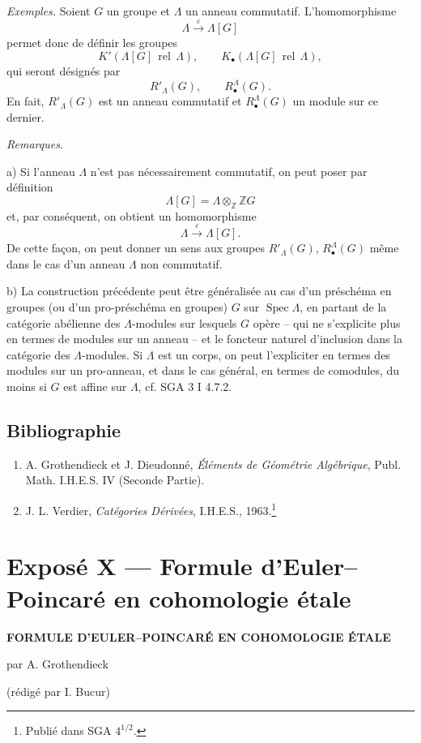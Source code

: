 \documentclass[11pt]{article}
\DeclareMathOperator{\Spec}{Spec}
\providecommand{\Spec}{\operatorname{Spec}}
\providecommand{\Spec}{\operatorname{Spec}}
\providecommand{\Spec}{\operatorname{Spec}}
\providecommand{\Spec}{\operatorname{Spec}}
\begin{document}
\emph{Exemples.} Soient $G$ un groupe et $\Lambda$ un anneau commutatif. L'homomorphisme
\[
\Lambda\xrightarrow{\varepsilon}\Lambda[G]
\]
permet donc de définir les groupes
\[
K'(\Lambda[G]\operatorname{\,rel\,}\Lambda),\qquad
K_\bullet(\Lambda[G]\operatorname{\,rel\,}\Lambda),
\]
qui seront désignés par
\[
R'_\Lambda(G),\qquad R^\Lambda_\bullet(G).
\]
En fait, $R'_\Lambda(G)$ est un anneau commutatif et $R^\Lambda_\bullet(G)$ un module sur ce dernier.

\emph{Remarques.}

a) Si l'anneau $\Lambda$ n'est pas nécessairement commutatif, on peut poser par définition
\[
\Lambda[G]=\Lambda\otimes_{\mathbb Z}\mathbb ZG
\]
et, par conséquent, on obtient un homomorphisme
\[
\Lambda\xrightarrow{\varepsilon}\Lambda[G].
\]
De cette façon, on peut donner un sens aux groupes $R'_\Lambda(G)$, $R^\Lambda_\bullet(G)$ même dans le cas d'un anneau $\Lambda$ non commutatif.

b) La construction précédente peut être généralisée au cas d'un préschéma en groupes (ou d'un pro-préschéma en groupes) $G$ sur $\Spec\Lambda$, en partant de la catégorie abélienne des $\Lambda$-modules sur lesquels $G$ opère -- qui ne s'explicite plus en termes de modules sur un anneau -- et le foncteur naturel d'inclusion dans la catégorie des $\Lambda$-modules. Si $\Lambda$ est un corps, on peut l'expliciter en termes des modules sur un pro-anneau, et dans le cas général, en termes de comodules, du moins si $G$ est affine sur $\Lambda$, cf. SGA 3 I 4.7.2.

\subsection*{Bibliographie}

\begin{enumerate}
\item[{[1]}] A. Grothendieck et J. Dieudonné, \emph{Éléments de Géométrie Algébrique}, Publ. Math. I.H.E.S. IV (Seconde Partie).
\item[{[2]}] J. L. Verdier, \emph{Catégories Dérivées}, I.H.E.S., 1963.\footnote{Publié dans SGA $4^{1/2}$.}
\end{enumerate}

\section*{Exposé X --- Formule d'Euler--Poincaré en cohomologie étale}

\begin{center}
\textbf{FORMULE D'EULER--POINCARÉ EN COHOMOLOGIE ÉTALE}

par A. Grothendieck

(rédigé par I. Bucur)
\end{center}
\end{document}

